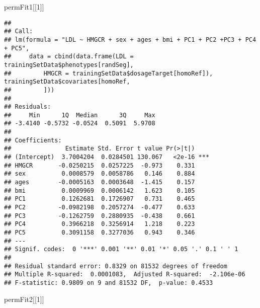 \documentclass[]{article}
\newenvironment{Shaded}{\begin{snugshade}}{\end{snugshade}}
\newcommand{\DecValTok}[1]{\textcolor[rgb]{0.00,0.00,0.81}{#1}}
\newcommand{\NormalTok}[1]{#1}
\begin{document}
\begin{Shaded}
\begin{Highlighting}[]
\NormalTok{permFit1[[}\DecValTok{1}\NormalTok{]]}
\end{Highlighting}
\end{Shaded}

\begin{verbatim}
## 
## Call:
## lm(formula = "LDL ~ HMGCR + sex + ages + bmi + PC1 + PC2 +PC3 + PC4 + PC5", 
##     data = cbind(data.frame(LDL = trainingSetData$phenotypes[randSeg], 
##         HMGCR = trainingSetData$dosageTarget[homoRef]), trainingSetData$covariates[homoRef, 
##         ]))
## 
## Residuals:
##     Min      1Q  Median      3Q     Max 
## -3.4140 -0.5732 -0.0524  0.5091  5.9708 
## 
## Coefficients:
##               Estimate Std. Error t value Pr(>|t|)    
## (Intercept)  3.7004204  0.0284501 130.067   <2e-16 ***
## HMGCR       -0.0250215  0.0257225  -0.973    0.331    
## sex          0.0008579  0.0058786   0.146    0.884    
## ages        -0.0005163  0.0003648  -1.415    0.157    
## bmi          0.0009969  0.0006142   1.623    0.105    
## PC1          0.1262681  0.1726907   0.731    0.465    
## PC2         -0.0982198  0.2057274  -0.477    0.633    
## PC3         -0.1262759  0.2880935  -0.438    0.661    
## PC4          0.3966218  0.3256914   1.218    0.223    
## PC5          0.3091158  0.3277036   0.943    0.346    
## ---
## Signif. codes:  0 '***' 0.001 '**' 0.01 '*' 0.05 '.' 0.1 ' ' 1
## 
## Residual standard error: 0.8329 on 81532 degrees of freedom
## Multiple R-squared:  0.0001083,  Adjusted R-squared:  -2.106e-06 
## F-statistic: 0.9809 on 9 and 81532 DF,  p-value: 0.4533
\end{verbatim}

\begin{Shaded}
\begin{Highlighting}[]
\NormalTok{permFit2[[}\DecValTok{1}\NormalTok{]]}
\end{Highlighting}
\end{Shaded}
\end{document}
